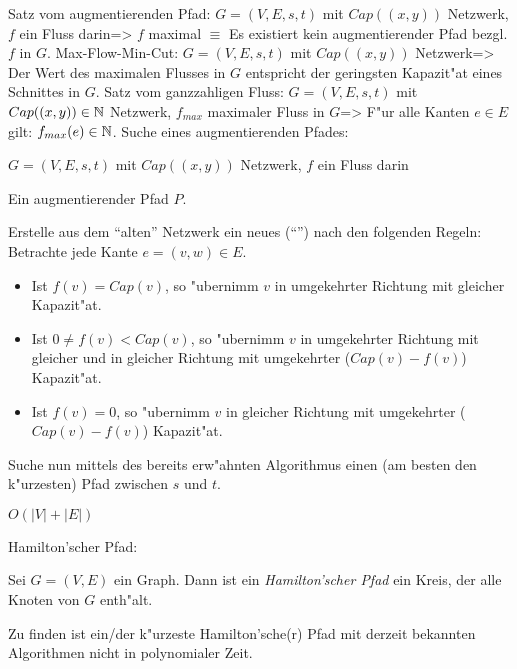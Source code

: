 \theorem Satz vom augmentierenden Pfad:
  $G=(V,E,s,t)$ mit $Cap((x,y))$ Netzwerk, $f$ ein Fluss darin=>
{
  $f$ maximal $\equiv$ Es existiert kein augmentierender Pfad bezgl. $f$ in $G$.
}
\theorem Max-Flow-Min-Cut:
  $G=(V,E,s,t)$ mit $Cap((x,y))$ Netzwerk=>
{
  Der Wert des maximalen Flusses in $G$ entspricht der geringsten Kapazit"at
  eines Schnittes in $G$.
}
\theorem Satz vom ganzzahligen Fluss:
    $G=(V,E,s,t)$ mit $Cap((x,y))\in\mathbb N$ Netzwerk, 
    $f_{max}$ maximaler Fluss in $G$=>
{
  F"ur alle Kanten $e\in E$ gilt: $f_{max}(e)\in\mathbb N$.
}
\algorithm Suche eines augmentierenden Pfades:{
  \given $G=(V,E,s,t)$ mit $Cap((x,y))$ Netzwerk, $f$ ein Fluss darin
  
  \aim Ein augmentierender Pfad $P$.
  
  \begin{proc}
    \item Erstelle aus dem ``alten'' Netzwerk ein neues 
    (``'') nach den folgenden Regeln: Betrachte 
    jede Kante $e=(v,w)\in E$.
      \begin{itemize}
        \item Ist $f(v)=Cap(v)$, so "ubernimm $v$ in umgekehrter Richtung
          mit gleicher Kapazit"at.
        \item Ist $0\ne f(v)<Cap(v)$, so "ubernimm $v$ in umgekehrter Richtung
          mit gleicher und in gleicher Richtung mit umgekehrter ($Cap(v)-f(v)$)
          Kapazit"at.
        \item Ist $f(v)=0$, so "ubernimm $v$ in gleicher Richtung mit 
	  umgekehrter ($Cap(v)-f(v)$) Kapazit"at.
      \end{itemize}
    \item Suche nun mittels des bereits erw"ahnten Algorithmus einen
      (am besten den k"urzesten) Pfad zwischen $s$ und $t$.
  \end{proc}
  
  \cpx $O(|V|+|E|)$
}
 Hamilton'scher Pfad:{
  Sei $G=(V,E)$ ein Graph. Dann ist ein \textit{Hamilton'scher Pfad} ein 
  Kreis, der alle Knoten von $G$ enth"alt.
  
  Zu finden ist ein/der k"urzeste Hamilton'sche(r) Pfad mit derzeit bekannten
  Algorithmen nicht in polynomialer Zeit.
}
